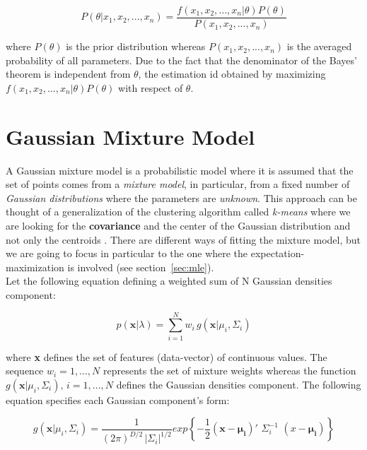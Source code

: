 \begin{equation}
	P (\theta | x_{1}, x_{2}, ... , x_{n}) = \frac{f(x_{1}, x_{2}, ... , x_{n} | \theta) P(\theta)}{P(x_{1}, x_{2}, ... , x_{n})}
\end{equation}

\noindent where $P(\theta)$ is the prior distribution whereas $P(x_{1}, x_{2}, ... , x_{n})$ is the averaged probability of all parameters. Due to the fact that the denominator of the Bayes' theorem is independent from $\theta$, the estimation id obtained by maximizing $f(x_{1}, x_{2}, ... , x_{n} | \theta) P(\theta)$ with respect of $\theta$.


\section{Gaussian Mixture Model}
A Gaussian mixture model is a probabilistic model where it is assumed that the set of points comes from a \textit{mixture model}, in particular, from a fixed number of \textit{Gaussian distributions} where the parameters are \textit{unknown}. This approach can be thought of a generalization of the clustering algorithm called \textit{k-means} where we are looking for the \textbf{covariance} and the center of the Gaussian distribution and not only the centroids \cite{sklearn_gmm}. There are different ways of fitting the mixture model, but we are going to focus in particular to the one where the expectation-maximization is involved (see section~\ref{sec:mle}). \\

\noindent Let the following equation defining a weighted sum of N Gaussian densities component:

\begin{equation}
	p(\textbf{x}|\lambda) = \sum_{i=1}^{N} w_{i} \, g(\textbf{x}|\mu_{i}, \Sigma_{i})
\end{equation}

\noindent where \textbf{x} defines the set of features (data-vector) of continuous values. The sequence $w_{i} = 1, ... , N$ represents the set of mixture weights whereas the function $g(\textbf{x}|\mu_{i}, \Sigma_{i}), \, i = 1, ... , N$ defines the Gaussian densities component. The following equation specifies each Gaussian component's form:

\begin{equation}
	g(\textbf{x}|\mu_{i}, \Sigma_{i}) = \frac{1}{(2\pi)^{D/2} \, |\Sigma_{i}|^{1/2}} exp \left \{ -\frac{1}{2} (\textbf{x} - \mathbf{\mu_{i}})' \,\, \Sigma_{i}^{-1} \,\, (x - \mathbf{\mu_{i}}) \right \}
\end{equation}


